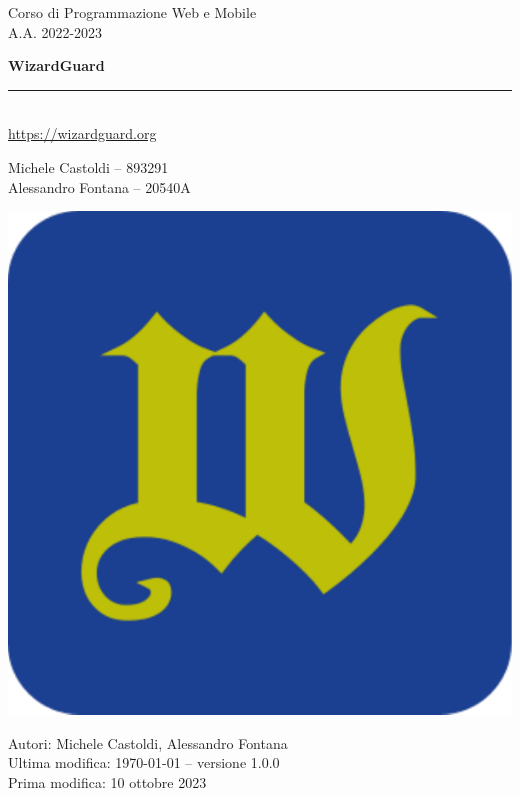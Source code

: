 \documentclass[a4paper]{report}
\begin{document}
\sffamily


\begin{titlepage}
	\clearpage\thispagestyle{empty}
	\centering
	\vspace{1cm}

	{\LARGE Corso di Programmazione Web e Mobile \\ 
		A.A. 2022-2023 \par}
		\vspace{3cm}
	{\bfseries\Huge WizardGuard \\ \vskip0.1cm}
    \noindent\textcolor{wizard}{\rule{10cm}{1.5mm}}\\
    {\LARGE \url{https://wizardguard.org} \\ \vskip0.1cm}
	\vspace{3.6cm}
	{\Large Michele Castoldi -- 893291 \\
	        Alessandro Fontana -- 20540A \par}
	\vspace{3cm}
    
    \centering \includegraphics[scale=0.4]{wizardguard}
    
    \vspace{2.6cm}
		
	\raggedright{\normalsize Autori: Michele Castoldi, Alessandro Fontana \\Ultima modifica: \today{} -- versione 1.0.0 \\
    Prima modifica: 10 ottobre 2023 \par}
	
	\pagebreak

\end{titlepage}
\end{document}
